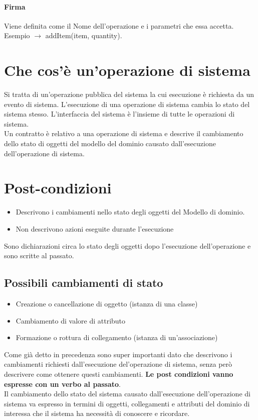 \paragraph*{Firma} Viene definita come il Nome dell'operazione e i parametri che essa accetta.
Esempio $\rightarrow$ addItem(item, quantity).
\section{Che cos'è un'operazione di sistema}
Si tratta di un'operazione pubblica del sistema la cui esecuzione è richiesta da un evento di sistema.
L'esecuzione di una operazione di sistema cambia lo stato del sistema stesso.
L'interfaccia del sistema è l'insieme di tutte le operazioni di sistema.
\\ Un contratto è relativo a una operazione di sistema e descrive il cambiamento dello stato di oggetti del
modello del dominio causato dall'esecuzione dell'operazione di sistema.
\section{Post-condizioni}
\begin{itemize}
    \item Descrivono i cambiamenti nello stato degli oggetti del Modello di dominio.
    \item Non descrivono azioni eseguite durante l'esecuzione
\end{itemize}
Sono dichiarazioni circa lo stato degli oggetti dopo l'esecuzione dell'operazione e sono scritte al passato.
\subsection{Possibili cambiamenti di stato}
\begin{itemize}
    \item Creazione o cancellazione di oggetto (istanza di una classe)
    \item Cambiamento di valore di attributo
    \item Formazione o rottura di collegamento (istanza di un'associazione)
\end{itemize}
Come già detto in precedenza sono super importanti dato che descrivono i cambiamenti richiesti dall'esecuzione
del'operazione di sistema, senza però descrivere come ottenere questi cambiamenti.
\textbf{Le post condizioni vanno espresse con un verbo al passato}.
\\ Il cambiamento dello stato del sistema causato dall'esecuzione dell'operazione di sistema va espresso
in termini di oggetti, collegamenti e attributi del dominio di interessa che il sistema ha necessità di conoscere
e ricordare.
